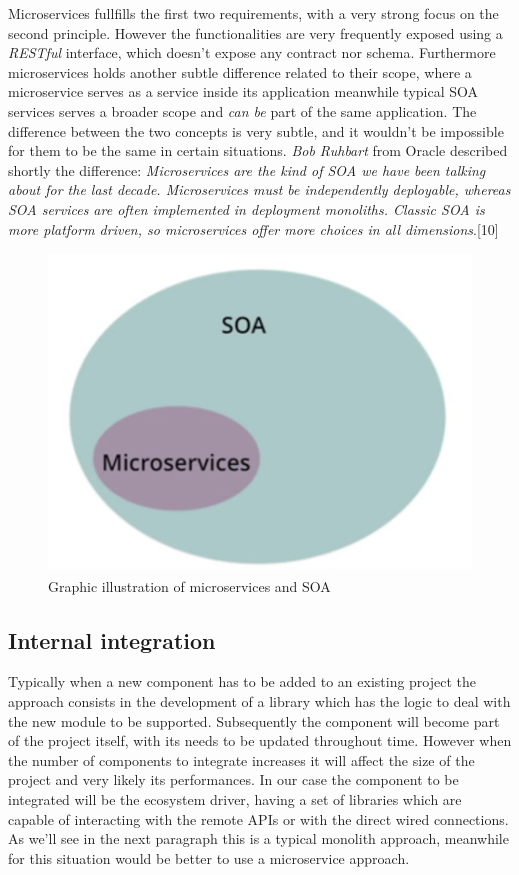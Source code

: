 Microservices fullfills the first two requirements, with a very strong focus on the second principle.
However the functionalities are very frequently exposed using a \textit{RESTful} interface, which
doesn't expose any contract nor schema. Furthermore microservices holds another subtle difference related to their
scope, where a microservice serves as a service inside its application meanwhile typical SOA services
serves a broader scope and \textit{can be} part of the same application.
The difference between the two concepts is very subtle, and it wouldn't be impossible for them
to be the same in certain situations. \textit{Bob Ruhbart} from Oracle described shortly the difference:
\textit{Microservices are the kind of SOA we have been talking about for the last decade. Microservices must be independently deployable,
whereas SOA services are often implemented in deployment monoliths.
Classic SOA is more platform driven, so microservices offer more choices
in all dimensions}.[10]

\begin{figure}[h]
\caption{Graphic illustration of microservices and SOA}
\centering
\includegraphics[scale=1]{soavsmicro.png}
\end{figure}

\subsection{Internal integration}
Typically when a new component has to be added to an existing
project the approach consists in the development of a library which
has the logic to deal with the new module to be supported. Subsequently the component
will
become part of the project itself, with its needs to be updated throughout time.
However when the number of components to integrate increases it will affect the size
of the project and very likely its performances.
In our case the component to be integrated will be the ecosystem driver,
having a set of libraries which are capable of interacting with the remote APIs or
with the direct wired connections. As we'll see in the next paragraph this is a typical
monolith approach, meanwhile for this situation would be better to use a microservice approach.

